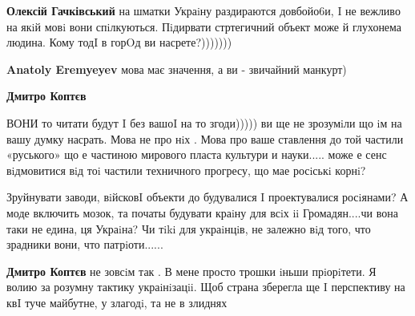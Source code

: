 \begin{itemize}
\begin{itemize}
\begin{itemize}
 
\textbf{Олексій Гачківський} на шматки Украiну раздираются довбойо6и, I не вежливо на якiй мовi вони спiлкуються. Пiдирвати стртегичний объект може й глухонема людина. Кому тодI в горOд ви насрете?)))))))

 
\textbf{Anatoly Eremyeyev} мова має значення, а ви - звичайний манкурт)

 
\textbf{Дмитро Коптєв} 

ВОНИ то читати будут I без вашоI на то згоди))))) ви ще не зрозумiли що iм на
вашу думку насрать. Мова не про нiх . Мова про ваше ставлення до той частили
«руського» що е частиною мирового пласта культури и науки..... може е сенс
вiдмовитися вiд тоi частили техничного прогресу, що мае росiськi корнi?

Зруйнувати заводи, вiйсковI объекти до будувалися I проектувалися росiянами? А
моде включить мозок, та початы будувати краiну для всiх ii Громадян....чи вона
таки не едина, ця Украiна? Чи тiki для украiнцiв, не залежно вiд того, что
зрадники вони, что патрiоти......

 
\textbf{Дмитро Коптєв} не зовсiм так . В мене просто трошки iньши прiорiтети. Я волию за розумну тактику украiнiзацii. Щоб страна зберегла ще I перспективу на квI туче майбутне, у злагодi, та не в злиднях

 

\end{itemize}
\end{itemize}
\end{itemize}
